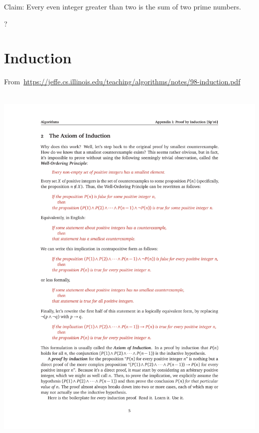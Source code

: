 \documentclass[12pt]{article}
\begin{document}
Claim: Every even integer greater than two is the sum of two prime numbers.

?


\clearpage
\section{Induction}

From~\url{https://jeffe.cs.illinois.edu/teaching/algorithms/notes/98-induction.pdf}\\~

\includegraphics{w01-inductionA.pdf}\\
\end{document}
